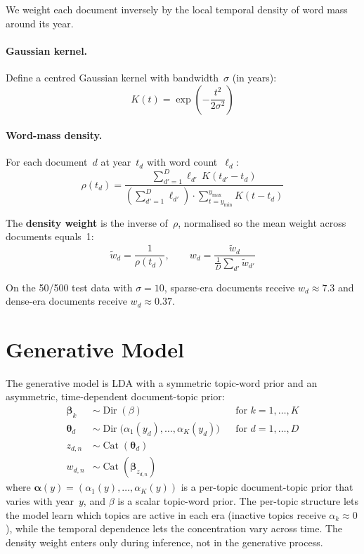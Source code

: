 \documentclass[11pt]{article}
\begin{document}
We weight each document inversely by the local temporal density of word mass around its year.

\paragraph{Gaussian kernel.}
Define a centred Gaussian kernel with bandwidth~$\sigma$ (in years):
\[
K(t) = \exp\!\left( -\frac{t^2}{2\sigma^2} \right)
\]

\paragraph{Word-mass density.}
For each document~$d$ at year~$t_d$ with word count~$\ell_d$:
\[
\rho(t_d)
  = \frac{\displaystyle\sum_{d'=1}^{D} \ell_{d'}\, K(t_{d'} - t_d)}
         {\displaystyle\left(\sum_{d'=1}^{D} \ell_{d'}\right)
          \cdot \sum_{t=y_{\min}}^{y_{\max}} K(t - t_d)}
\]

The \textbf{density weight} is the inverse of~$\rho$, normalised so the mean weight across documents equals~1:
\[
\widetilde w_d = \frac{1}{\rho(t_d)},
\qquad
w_d = \frac{\widetilde w_d}{\frac{1}{D}\sum_{d'}\widetilde w_{d'}}
\]

On the 50/500 test data with $\sigma=10$, sparse-era documents receive $w_d \approx 7.3$ and dense-era documents receive $w_d \approx 0.37$.

\section{Generative Model}

The generative model is LDA with a symmetric topic-word prior and an asymmetric, time-dependent document-topic prior:
\[
\begin{aligned}
\boldsymbol\beta_k &\sim \operatorname{Dir}(\beta) &&\text{for } k = 1,\ldots,K \\
\boldsymbol\theta_d &\sim \operatorname{Dir}\!\bigl(\alpha_1(y_d),\ldots,\alpha_K(y_d)\bigr) &&\text{for } d = 1,\ldots,D \\
z_{d,n} &\sim \operatorname{Cat}(\boldsymbol\theta_d) \\
w_{d,n} &\sim \operatorname{Cat}(\boldsymbol\beta_{z_{d,n}})
\end{aligned}
\]
where $\boldsymbol\alpha(y) = (\alpha_1(y),\ldots,\alpha_K(y))$ is a per-topic document-topic prior that varies with year~$y$, and $\beta$ is a scalar topic-word prior.
The per-topic structure lets the model learn which topics are active in each era (inactive topics receive $\alpha_k \approx 0$), while the temporal dependence lets the concentration vary across time.
The density weight enters only during inference, not in the generative process.
\end{document}
